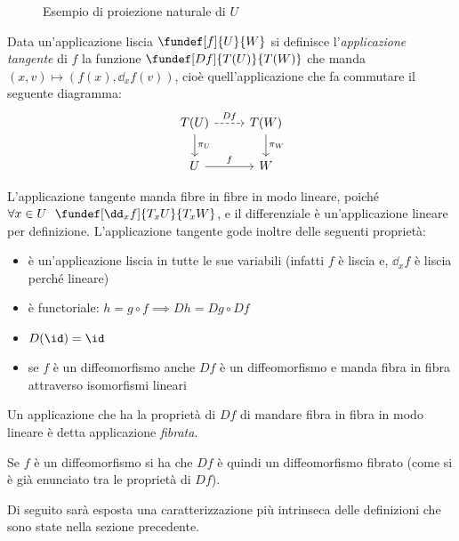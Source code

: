 \begin{figure}
\centering

\caption{Esempio di proiezione naturale di $U$}
\end{figure}

\begin{defn}
Data un'applicazione liscia $\fundef[f]{U}{W}$ si definisce l'\emph{applicazione tangente} di $f$ la funzione $\fundef[Df]{T(U)}{T(W)}$ che manda $(x,v) \mapsto (f(x), \dd_xf(v))$, cioè quell'applicazione che fa commutare il seguente diagramma:
\begin{equation*}
\begin{tikzcd}
	T(U) \arrow[r, dashrightarrow, "Df"] \arrow[d, "\pi_U"]
		& T(W) \arrow[d, "\pi_W"] \\
	U \arrow[r, "f"]
		& W
\end{tikzcd}
\end{equation*}
\end{defn}

\begin{oss}
L'applicazione tangente manda fibre in fibre in modo lineare, poiché $\forall x\in U\ \ \fundef[\dd_xf]{T_x U}{T_x W}$, e il differenziale è un'applicazione lineare per definizione.
L'applicazione tangente gode inoltre delle seguenti proprietà:
\begin{itemize}
\item è un'applicazione liscia in tutte le sue variabili (infatti $f$ è liscia e, $\dd_xf$ è liscia perché lineare)
\item è functoriale: $h = g\circ f \implies Dh = Dg\circ Df$
\item $D(\id) = \id$
\item se $f$ è un diffeomorfismo anche $Df$ è un diffeomorfismo e manda fibra in fibra attraverso isomorfismi lineari
\end{itemize}
\end{oss}

\begin{defn}
Un applicazione che ha la proprietà di $Df$ di mandare fibra in fibra in modo lineare è detta applicazione \emph{fibrata}.
\end{defn}

Se $f$ è un diffeomorfismo si ha che $Df$ è quindi un diffeomorfismo fibrato (come si è già enunciato tra le proprietà di $Df$).


Di seguito sarà esposta una caratterizzazione più intrinseca delle definizioni che sono state nella sezione precedente.


